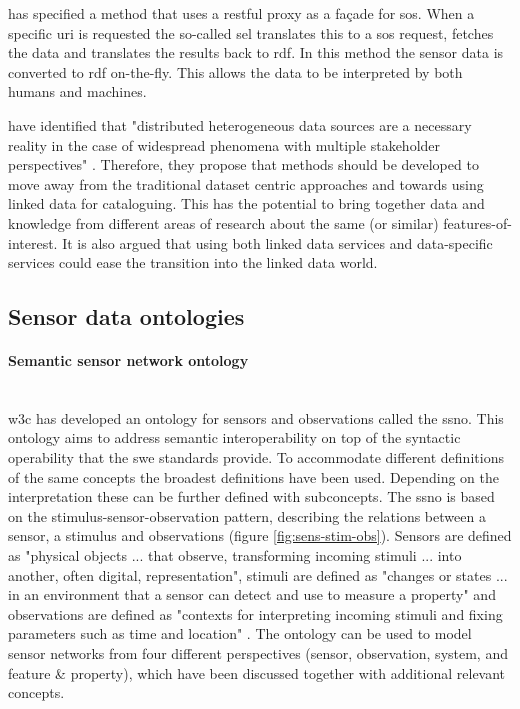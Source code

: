 \cite{SSW:Janowicz} has specified a method that uses a \ac{rest}ful proxy as a fa\c{c}ade for \ac{sos}. When a specific \ac{uri} is requested the so-called \ac{sel} translates this to a \ac{sos} request, fetches the data and translates the results back to \ac{rdf}. In this method the sensor data is converted to \ac{rdf} on-the-fly. This allows the data to be interpreted by both humans and machines.  

\cite{SSW:Atkinson} have identified that "distributed heterogeneous data sources are a necessary reality in the case of widespread
phenomena with multiple stakeholder perspectives" \cite[p.129]{SSW:Atkinson}. Therefore, they propose that methods should be developed to move away from the traditional dataset centric approaches and towards using linked data for cataloguing. This has the potential to bring together data and knowledge from different areas of research about the same (or similar) features-of-interest. It is also argued that using both linked data services and data-specific services could ease the transition into the linked data world.  

\subsection{Sensor data ontologies}
\paragraph{Semantic sensor network ontology} \mbox{}\\
 \ac{w3c} has developed an ontology for sensors and observations called the \ac{ssno}. This ontology aims to address semantic interoperability on top of the syntactic operability that the \ac{swe} standards provide. To accommodate different definitions of the same concepts the broadest definitions have been used. Depending on the interpretation these can be further defined with subconcepts. The \ac{ssno} is based on the stimulus-sensor-observation pattern, describing the relations between a sensor, a stimulus and observations (figure \ref{fig:sens-stim-obs}). Sensors are defined as "physical objects ... that observe, transforming incoming stimuli ... into another, often digital, representation", stimuli are defined as "changes or states ... in an environment that a sensor can detect and use to measure a property" and observations are defined as "contexts for interpreting incoming stimuli and fixing parameters such as time and location" \cite[p 28]{SSW:SSN_incubatorGroup}. The ontology can be used to model sensor networks from four different perspectives (sensor, observation, system, and feature \& property), which have been discussed together with additional relevant concepts.

